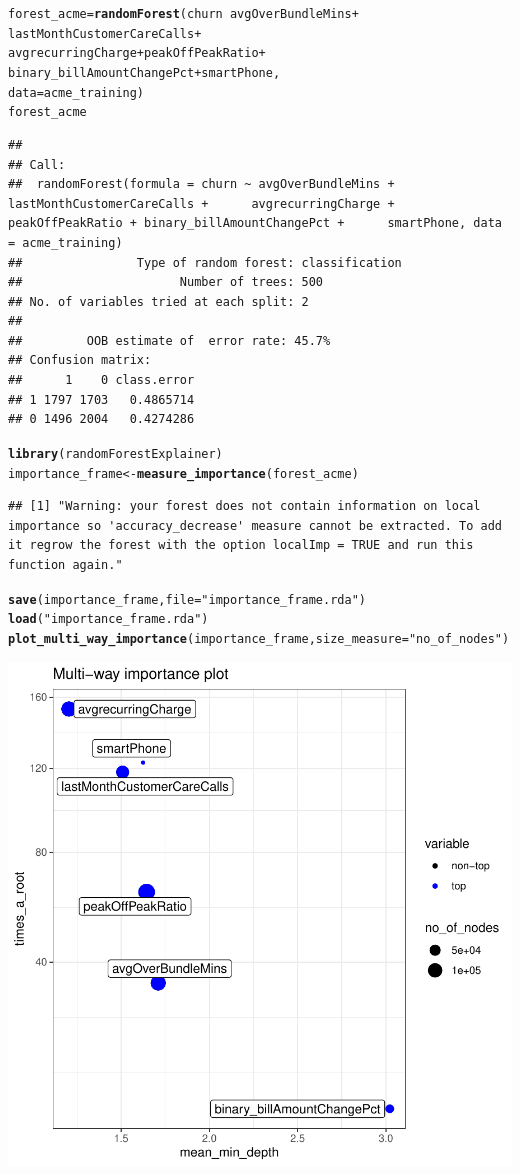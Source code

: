 \documentclass{article}\usepackage[]{graphicx}\usepackage[]{xcolor}
\makeatletter
\newcommand{\hlstr}[1]{\textcolor[rgb]{0.192,0.494,0.8}{#1}}%
\newcommand{\hlopt}[1]{\textcolor[rgb]{0,0,0}{#1}}%
\newcommand{\hlstd}[1]{\textcolor[rgb]{0.345,0.345,0.345}{#1}}%
\newcommand{\hlkwb}[1]{\textcolor[rgb]{0.69,0.353,0.396}{#1}}%
\newcommand{\hlkwc}[1]{\textcolor[rgb]{0.333,0.667,0.333}{#1}}%
\newcommand{\hlkwd}[1]{\textcolor[rgb]{0.737,0.353,0.396}{\textbf{#1}}}%
\newenvironment{kframe}{%
 \def\at@end@of@kframe{}%
 \ifinner\ifhmode%
  \def\at@end@of@kframe{\end{minipage}}%
  \begin{minipage}{\columnwidth}%
 \fi\fi%
 \def\FrameCommand##1{\hskip\@totalleftmargin \hskip-\fboxsep
 \colorbox{shadecolor}{##1}\hskip-\fboxsep
     \hskip-\linewidth \hskip-\@totalleftmargin \hskip\columnwidth}%
 \MakeFramed {\advance\hsize-\width
   \@totalleftmargin\z@ \linewidth\hsize
   \@setminipage}}%
 {\par\unskip\endMakeFramed%
 \at@end@of@kframe}
\newenvironment{knitrout}{}{} %
\makeatother
\begin{document}
\begin{knitrout}
\begin{kframe}
\begin{alltt}
\hlstd{forest_acme} \hlkwb{=} \hlkwd{randomForest}\hlstd{(churn} \hlopt{~} \hlstd{avgOverBundleMins} \hlopt{+}
                             \hlstd{lastMonthCustomerCareCalls} \hlopt{+}
                             \hlstd{avgrecurringCharge} \hlopt{+} \hlstd{peakOffPeakRatio} \hlopt{+}
                             \hlstd{binary_billAmountChangePct} \hlopt{+} \hlstd{smartPhone,}
                           \hlkwc{data}\hlstd{=acme_training)}
\hlstd{forest_acme}
\end{alltt}
\begin{verbatim}
## 
## Call:
##  randomForest(formula = churn ~ avgOverBundleMins + lastMonthCustomerCareCalls +      avgrecurringCharge + peakOffPeakRatio + binary_billAmountChangePct +      smartPhone, data = acme_training) 
##                Type of random forest: classification
##                      Number of trees: 500
## No. of variables tried at each split: 2
## 
##         OOB estimate of  error rate: 45.7%
## Confusion matrix:
##      1    0 class.error
## 1 1797 1703   0.4865714
## 0 1496 2004   0.4274286
\end{verbatim}
\begin{alltt}
\hlkwd{library}\hlstd{(randomForestExplainer)}
\hlstd{importance_frame} \hlkwb{<-} \hlkwd{measure_importance}\hlstd{(forest_acme)}
\end{alltt}
\begin{verbatim}
## [1] "Warning: your forest does not contain information on local importance so 'accuracy_decrease' measure cannot be extracted. To add it regrow the forest with the option localImp = TRUE and run this function again."
\end{verbatim}
\begin{alltt}
\hlkwd{save}\hlstd{(importance_frame,} \hlkwc{file} \hlstd{=} \hlstr{"importance_frame.rda"}\hlstd{)}
\hlkwd{load}\hlstd{(}\hlstr{"importance_frame.rda"}\hlstd{)}
\hlkwd{plot_multi_way_importance}\hlstd{(importance_frame,} \hlkwc{size_measure} \hlstd{=} \hlstr{"no_of_nodes"}\hlstd{)}
\end{alltt}
\end{kframe}

{\centering \includegraphics[width=.6\linewidth]{figure/RF1-SOLUCION-Rnwauto-report-4} 

}


\end{knitrout}
\end{document}
